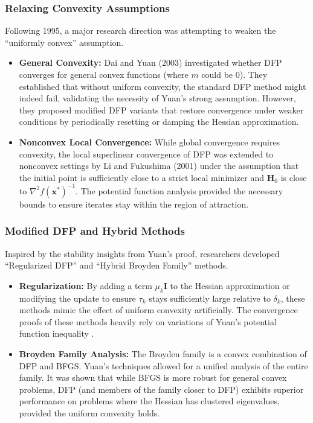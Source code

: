 \documentclass[12pt,a4paper]{article}  %
\newcounter{cite}
\theoremstyle{definition}
\numberwithin{equation}{section}
\newcommand{\HH}{\bm{H}}
\newcommand{\xx}{\mathbf{x}}
\begin{document}
\subsubsection{Relaxing Convexity Assumptions}
Following 1995, a major research direction was attempting to weaken the ``uniformly convex'' assumption.
\begin{itemize}
    \item \textbf{General Convexity:} Dai and Yuan (2003) \cite{dai2003} investigated whether DFP converges for general convex functions (where $m$ could be 0). They established that without uniform convexity, the standard DFP method might indeed fail, validating the necessity of Yuan's strong assumption. However, they proposed modified DFP variants that restore convergence under weaker conditions by periodically resetting or damping the Hessian approximation.
    \item \textbf{Nonconvex Local Convergence:} While global convergence requires convexity, the local superlinear convergence of DFP was extended to nonconvex settings by Li and Fukushima (2001) \cite{li2001} under the assumption that the initial point is sufficiently close to a strict local minimizer and $\HH_0$ is close to $\nabla^2 f(\xx^*)^{-1}$. The potential function analysis provided the necessary bounds to ensure iterates stay within the region of attraction.
\end{itemize}

\subsubsection{Modified DFP and Hybrid Methods}
Inspired by the stability insights from Yuan's proof, researchers developed ``Regularized DFP'' and ``Hybrid Broyden Family'' methods.
\begin{itemize}
    \item \textbf{Regularization:} By adding a term $\mu_k \mathbf{I}$ to the Hessian approximation or modifying the update to ensure $\tau_k$ stays sufficiently large relative to $\delta_k$, these methods mimic the effect of uniform convexity artificially. The convergence proofs of these methods heavily rely on variations of Yuan's potential function inequality \cite{li2001}.
    \item \textbf{Broyden Family Analysis:} The Broyden family is a convex combination of DFP and BFGS. Yuan's techniques allowed for a unified analysis of the entire family. It was shown that while BFGS is more robust for general convex problems, DFP (and members of the family closer to DFP) exhibits superior performance on problems where the Hessian has clustered eigenvalues, provided the uniform convexity holds.
\end{itemize}
\end{document}
